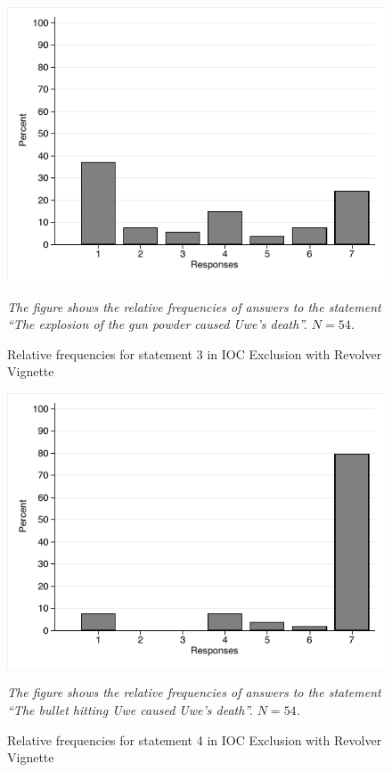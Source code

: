 \documentclass[egregdoesnotlikesansseriftitles,12pt]{scrartcl}
\begin{document}
\begin{figure}[H]
   \centering
   \includegraphics[scale=0.8]{figures/rev_ioc_hist_3.pdf}
   \begin{minipage}{0.9\linewidth}
   \footnotesize
   \emph{The figure shows the relative frequencies of answers to the statement ``The explosion of the gun powder caused Uwe's death''. $N=54$.}
   \end{minipage}
   \caption{Relative frequencies for statement 3 in IOC Exclusion with Revolver Vignette}
   \label{fig:rev_ioc_hist_3}
\end{figure}

\begin{figure}[H]
   \centering
   \includegraphics[scale=0.8]{figures/rev_ioc_hist_4.pdf}
   \begin{minipage}{0.9\linewidth}
   \footnotesize
   \emph{The figure shows the relative frequencies of answers to the statement ``The bullet hitting Uwe caused Uwe's death''. $N=54$.}
   \end{minipage}
   \caption{Relative frequencies for statement 4 in IOC Exclusion with Revolver Vignette}
   \label{fig:rev_ioc_hist_4}
\end{figure}
\end{document}
